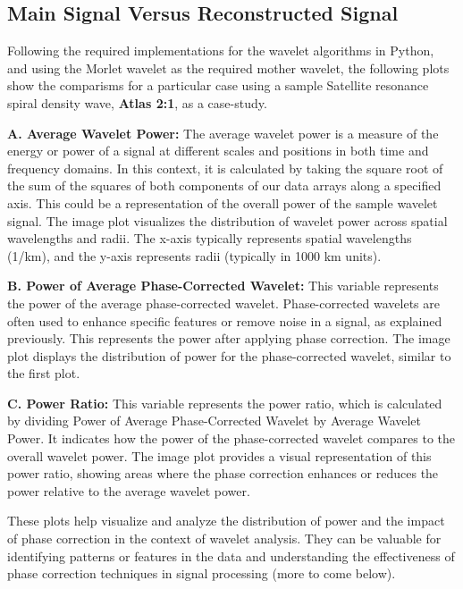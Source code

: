 \documentclass{article}
\begin{document}
\subsection{Main Signal Versus Reconstructed Signal}
Following the required implementations for the wavelet algorithms in Python, and using the Morlet wavelet as the required mother wavelet, the following plots show the comparisms for a particular case using a sample Satellite resonance spiral density wave, \textbf{Atlas 2:1}, as a case-study. 


\textbf{A. Average Wavelet Power:}
The average wavelet power is a measure of the energy or power of a signal at different scales and positions in both time and frequency domains. In this context, it is calculated by taking the square root of the sum of the squares of both components of our data arrays along a specified axis. This could be a representation of the overall power of the sample wavelet signal. The image plot visualizes the distribution of wavelet power across spatial wavelengths and radii. The x-axis typically represents spatial wavelengths (1/km), and the y-axis represents radii (typically in 1000 km units).

\textbf{B. Power of Average Phase-Corrected Wavelet:}
This variable represents the power of the average phase-corrected wavelet. Phase-corrected wavelets are often used to enhance specific features or remove noise in a signal, as explained previously. This represents the power after applying phase correction. The image plot displays the distribution of power for the phase-corrected wavelet, similar to the first plot.

\textbf{C. Power Ratio:}
This variable represents the power ratio, which is calculated by dividing Power of Average Phase-Corrected Wavelet by Average Wavelet Power. It indicates how the power of the phase-corrected wavelet compares to the overall wavelet power. The image plot provides a visual representation of this power ratio, showing areas where the phase correction enhances or reduces the power relative to the average wavelet power.

These plots help visualize and analyze the distribution of power and the impact of phase correction in the context of wavelet analysis. They can be valuable for identifying patterns or features in the data and understanding the effectiveness of phase correction techniques in signal processing (more to come below).

\vspace{0.5pt}
\end{document}
